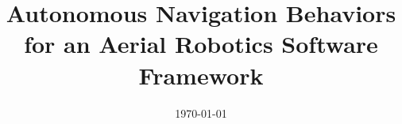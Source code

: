 \documentclass[a4paper, 11pt, oneside]{Thesis}  %
\begin{document}
  \frontmatter      %

  \title {Autonomous Navigation Behaviors for an Aerial Robotics Software Framework}
  \addresses {
    \groupname\\\deptname\\\univname
  }  %
  \date {\today}
  \subject {}
  \keywords {}

  \maketitle

  \fancyhead{}  %
  \rhead{\thepage}  %
  \lhead{}  %
\end{document}
